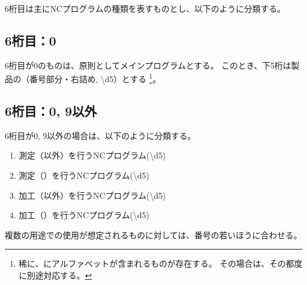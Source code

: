 \clearpage
6桁目は主にNCプログラムの種類を表すものとし、以下のように分類する。

\subsection{6桁目：0}
6桁目が0のものは、原則としてメインプログラムとする。
このとき、下5桁は製品の\DrawingNumber（番号部分・右詰め, {\ttfamily\textbackslash d{5}}）とする
\footnote{稀に、\DrawingNumber にアルファベットが含まれるものが存在する。
その場合は、その都度に別途対応する。}。

\subsection{6桁目：0, 9以外}
6桁目が0, 9以外の場合は、以下のように分類する。
\begin{enumerate}[label=\arabic*., ref=\arabic*, start=1]
\item\label{item:6Mmain} 測定（\Dimple 以外）を行うNCプログラム({\textbackslash d{5}})
\item\label{item:6MD} 測定（\Dimple）を行うNCプログラム({\textbackslash d{5}})
\setcounter{enumi}{3}
\item\label{item:6Kmain} 加工（\Dimple 以外）を行うNCプログラム({\textbackslash d{5}})
\item\label{item:6KD} 加工（\Dimple）を行うNCプログラム({\textbackslash d{5}})
\end{enumerate}
複数の用途での使用が想定されるものに対しては、番号の若いほうに合わせる。


